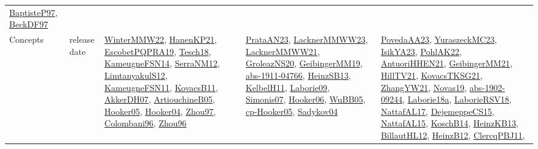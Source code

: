 {\begin{longtable}{llp{6cm}p{6cm}p{6cm}}
\href{papers/BaptisteP97.pdf}{BaptisteP97}\cite{BaptisteP97}, \href{papers/BeckDF97.pdf}{BeckDF97}\cite{BeckDF97}\\
Concepts & release date & \href{papers/WinterMMW22.pdf}{WinterMMW22}\cite{WinterMMW22}, \href{papers/HanenKP21.pdf}{HanenKP21}\cite{HanenKP21}, \href{articles/EscobetPQPRA19.pdf}{EscobetPQPRA19}\cite{EscobetPQPRA19}, \href{papers/Tesch18.pdf}{Tesch18}\cite{Tesch18}, \href{articles/KameugneFSN14.pdf}{KameugneFSN14}\cite{KameugneFSN14}, \href{papers/SerraNM12.pdf}{SerraNM12}\cite{SerraNM12}, \href{articles/LimtanyakulS12.pdf}{LimtanyakulS12}\cite{LimtanyakulS12}, \href{papers/KameugneFSN11.pdf}{KameugneFSN11}\cite{KameugneFSN11}, \href{articles/KovacsB11.pdf}{KovacsB11}\cite{KovacsB11}, \href{papers/AkkerDH07.pdf}{AkkerDH07}\cite{AkkerDH07}, \href{papers/ArtiouchineB05.pdf}{ArtiouchineB05}\cite{ArtiouchineB05}, \href{articles/Hooker05.pdf}{Hooker05}\cite{Hooker05}, \href{papers/Hooker04.pdf}{Hooker04}\cite{Hooker04}, \href{articles/Zhou97.pdf}{Zhou97}\cite{Zhou97}, \href{papers/Colombani96.pdf}{Colombani96}\cite{Colombani96}, \href{papers/Zhou96.pdf}{Zhou96}\cite{Zhou96} & \href{articles/PrataAN23.pdf}{PrataAN23}\cite{PrataAN23}, \href{articles/LacknerMMWW23.pdf}{LacknerMMWW23}\cite{LacknerMMWW23}, \href{papers/LacknerMMWW21.pdf}{LacknerMMWW21}\cite{LacknerMMWW21}, \href{papers/GroleazNS20.pdf}{GroleazNS20}\cite{GroleazNS20}, \href{papers/GeibingerMM19.pdf}{GeibingerMM19}\cite{GeibingerMM19}, \href{articles/abs-1911-04766.pdf}{abs-1911-04766}\cite{abs-1911-04766}, \href{articles/HeinzSB13.pdf}{HeinzSB13}\cite{HeinzSB13}, \href{articles/KelbelH11.pdf}{KelbelH11}\cite{KelbelH11}, \href{papers/Laborie09.pdf}{Laborie09}\cite{Laborie09}, \href{articles/Simonis07.pdf}{Simonis07}\cite{Simonis07}, \href{articles/Hooker06.pdf}{Hooker06}\cite{Hooker06}, \href{papers/WuBB05.pdf}{WuBB05}\cite{WuBB05}, \href{papers/cp-Hooker05.pdf}{cp-Hooker05}\cite{cp-Hooker05}, \href{papers/Sadykov04.pdf}{Sadykov04}\cite{Sadykov04} & \href{papers/PovedaAA23.pdf}{PovedaAA23}\cite{PovedaAA23}, \href{papers/YuraszeckMC23.pdf}{YuraszeckMC23}\cite{YuraszeckMC23}, \href{articles/IsikYA23.pdf}{IsikYA23}\cite{IsikYA23}, \href{articles/PohlAK22.pdf}{PohlAK22}\cite{PohlAK22}, \href{papers/AntuoriHHEN21.pdf}{AntuoriHHEN21}\cite{AntuoriHHEN21}, \href{papers/GeibingerMM21.pdf}{GeibingerMM21}\cite{GeibingerMM21}, \href{papers/HillTV21.pdf}{HillTV21}\cite{HillTV21}, \href{papers/KovacsTKSG21.pdf}{KovacsTKSG21}\cite{KovacsTKSG21}, \href{articles/ZhangYW21.pdf}{ZhangYW21}\cite{ZhangYW21}, \href{articles/Novas19.pdf}{Novas19}\cite{Novas19}, \href{articles/abs-1902-09244.pdf}{abs-1902-09244}\cite{abs-1902-09244}, \href{papers/Laborie18a.pdf}{Laborie18a}\cite{Laborie18a}, \href{articles/LaborieRSV18.pdf}{LaborieRSV18}\cite{LaborieRSV18}, \href{articles/NattafAL17.pdf}{NattafAL17}\cite{NattafAL17}, \href{papers/DejemeppeCS15.pdf}{DejemeppeCS15}\cite{DejemeppeCS15}, \href{articles/NattafAL15.pdf}{NattafAL15}\cite{NattafAL15}, \href{papers/KoschB14.pdf}{KoschB14}\cite{KoschB14}, \href{papers/HeinzKB13.pdf}{HeinzKB13}\cite{HeinzKB13}, \href{papers/BillautHL12.pdf}{BillautHL12}\cite{BillautHL12}, \href{papers/HeinzB12.pdf}{HeinzB12}\cite{HeinzB12}, \href{papers/ClercqPBJ11.pdf}{ClercqPBJ11}\cite{ClercqPBJ11}, 
\end{longtable}}
